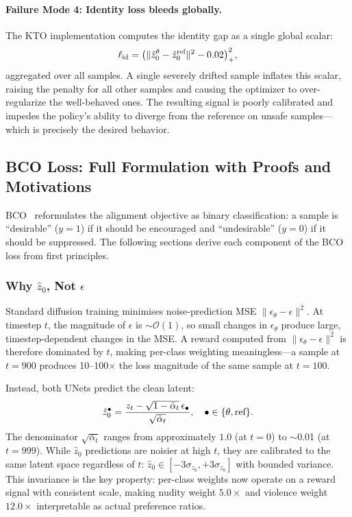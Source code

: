 \paragraph{Failure Mode 4: Identity loss bleeds globally.}
The KTO implementation computes the identity gap as a single global scalar:
\begin{equation}
  \ell_\text{id} = \big(\|{\hat{z}_0^\theta - \hat{z}_0^\text{ref}}\|^2 - 0.02\big)_+^2, \notag
\end{equation}
aggregated over all samples.
A single severely drifted sample inflates this scalar, raising the penalty
for all other samples and causing the optimizer to over-regularize the
well-behaved ones.
The resulting signal is poorly calibrated and impedes the policy's ability
to diverge from the reference on unsafe samples---which is precisely the
desired behavior.

\subsection{BCO Loss: Full Formulation with Proofs and Motivations}
\label{app:bco_full}

BCO~\cite{jung2024bco} reformulates the alignment objective as binary
classification: a sample is ``desirable'' ($y=1$) if it should be
encouraged and ``undesirable'' ($y=0$) if it should be suppressed.
The following sections derive each component of the BCO loss from first
principles.

\subsubsection{Why $\hat{z}_0$, Not $\epsilon$}

Standard diffusion training minimises noise-prediction MSE
$\|\epsilon_\theta - \epsilon\|^2$.
At timestep $t$, the magnitude of $\epsilon$ is $\sim\!\mathcal{O}(1)$, so
small changes in $\epsilon_\theta$ produce large, timestep-dependent changes
in the MSE.
A reward computed from $\|\epsilon_\theta - \epsilon\|^2$ is therefore
dominated by $t$, making per-class weighting meaningless---a sample at
$t=900$ produces 10--100$\times$ the loss magnitude of the same sample at
$t=100$.

Instead, both UNets predict the clean latent:
\begin{equation}
  \hat{z}_0^\bullet
  = \frac{z_t - \sqrt{1-\bar\alpha_t}\,\epsilon_\bullet}{\sqrt{\bar\alpha_t}},
  \quad \bullet \in \{\theta, \text{ref}\}. \notag
  \label{eq:z0hat}
\end{equation}
The denominator $\sqrt{\bar\alpha_t}$ ranges from approximately $1.0$
(at $t=0$) to $\sim$0.01 (at $t=999$).
While $\hat{z}_0$ predictions are noisier at high $t$, they are calibrated
to the same latent space regardless of $t$: $\hat{z}_0 \in
[-3\sigma_{z_0}, +3\sigma_{z_0}]$ with bounded variance.
This invariance is the key property: per-class weights now operate on a
reward signal with consistent scale, making nudity weight $5.0\times$ and
violence weight $12.0\times$ interpretable as actual preference ratios.

